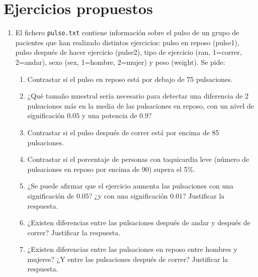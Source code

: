 \section{Ejercicios propuestos}
\begin{enumerate}[leftmargin=*] 
\item El fichero \texttt{pulso.txt} contiene información sobre el pulso de un grupo de pacientes que han realizado
distintos ejercicios:
pulso en reposo (pulse1), pulso después de hacer ejercicio (pulse2), tipo de ejercicio (ran, 1=correr, 2=andar), sexo
(sex, 1=hombre, 2=mujer) y peso (weight).
Se pide:
\begin{enumerate}
\item Contrastar si el pulso en reposo está por debajo de 75 pulsaciones.
\item ¿Qué tamaño muestral sería necesario para detectar una diferencia de 2 pulsaciones más en la media de las
pulsaciones en reposo, con un nivel de significación $0.05$ y una potencia de $0.9$?
\item Contrastar si el pulso después de correr está por encima de 85 pulsaciones.
\item Contrastar si el porcentaje de personas con taquicardia leve (número de pulsaciones en reposo por encima de 90)
supera el 5\%.
\item ¿Se puede afirmar que el ejercicio aumenta las pulsaciones con una significación de $0.05$? 
¿y con una significación $0.01$?
Justificar la respuesta.
\item ¿Existen diferencias entre las pulsaciones después de andar y después de correr? Justificar la respuesta.
\item ¿Existen diferencias entre las pulsaciones en reposo entre hombres y mujeres? 
¿Y entre las pulsaciones después de correr? Justificar la respuesta.
\end{enumerate}

\end {enumerate}
